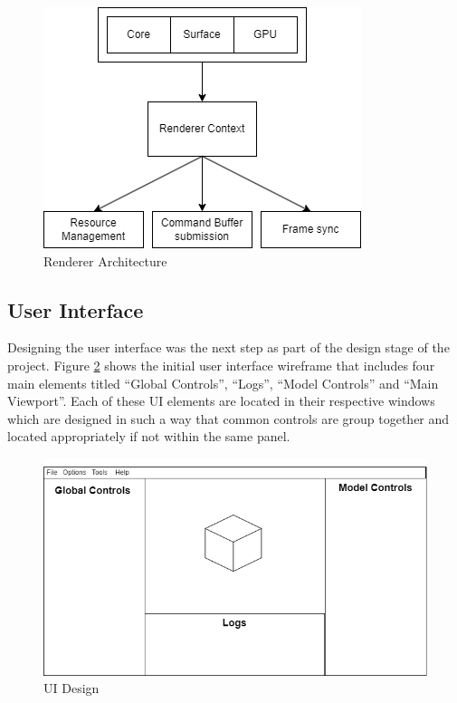 \documentclass[11pt]{article}
\begin{document}
\begin{figure}[ht]
  \centering
  \includegraphics[width=\textwidth]{images/renderer_architecture.png}
  \caption{Renderer Architecture}
  \label{fig:rendererarch}
\end{figure}

\subsection{User Interface}
Designing the user interface was the next step as part of the design stage of
the project. Figure \ref{fig:ui_design} shows the initial user interface
wireframe that includes four main elements titled ``Global Controls'', ``Logs'',
``Model Controls'' and ``Main Viewport''. Each of these UI elements are located
in their respective windows which are designed in such a way that common controls are group
together and located appropriately if not within the same panel.

\begin{figure}[ht]
  \centering
  \includegraphics[width=\textwidth]{images/ui_design.png}
  \caption{UI Design}
  \label{fig:ui_design}
\end{figure}
\end{document}
